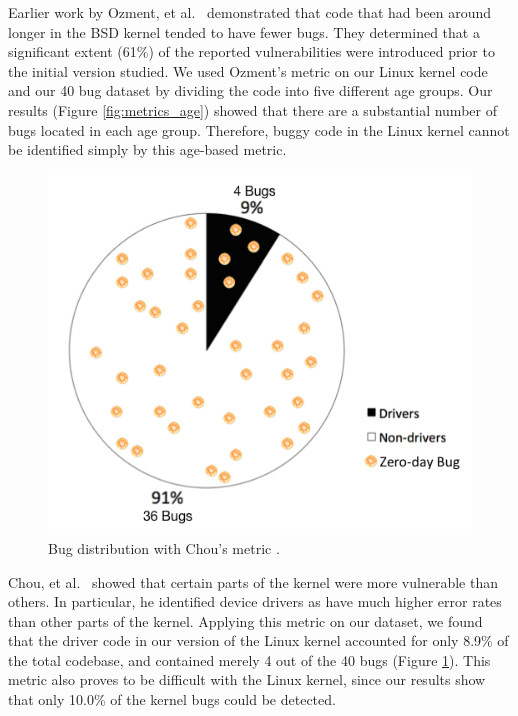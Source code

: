 Earlier work by Ozment, et al.~\cite{ozment2006milk} demonstrated that code that
had been around longer in the BSD kernel tended to have fewer bugs.
They determined that a significant extent (61\%) of the reported
vulnerabilities were
introduced prior to the initial version studied.
We used Ozment's metric on our Linux kernel code and our 40 bug dataset
by dividing the code into five different age groups.
Our results (Figure \ref{fig:metrics_age}) showed that there are a substantial
number of bugs located in each age group.
Therefore, buggy code in the Linux kernel cannot be identified simply
by this age-based metric.


\begin{figure}
\centering
\includegraphics[width=0.9\columnwidth]{diagram/metrics_drivers.png}
\caption{\small Bug distribution with Chou's metric \cite{PittSFIeld}.}
\label{fig:metrics_drivers}
\end{figure}

Chou, et al.~\cite{PittSFIeld} showed that certain parts of the kernel
were more vulnerable than others. In particular, he identified device drivers as
have much higher error rates than other parts of the kernel.
Applying this metric on our dataset, we found that the driver code in our version
of the Linux kernel accounted for only 8.9\% of the total codebase, and contained
merely 4 out of the 40 bugs (Figure \ref{fig:metrics_drivers}).
This metric also proves to be difficult with the
Linux kernel, since our results show that
only 10.0\% of the kernel bugs could be detected.

